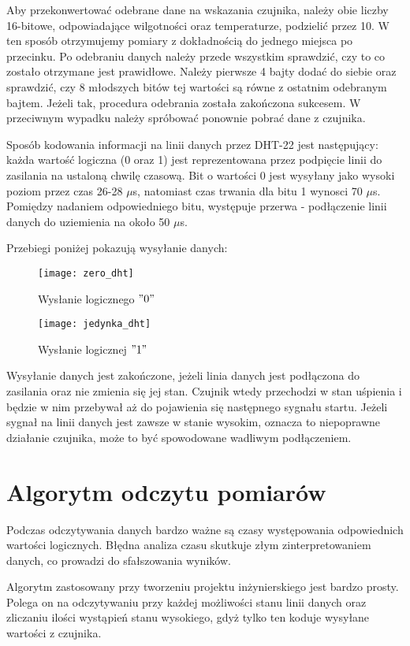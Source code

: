 Aby przekonwertować odebrane dane na wskazania czujnika, należy obie liczby 16-bitowe, odpowiadające wilgotności oraz temperaturze, podzielić przez 10. W ten sposób otrzymujemy pomiary z dokładnością do jednego miejsca po przecinku. Po odebraniu danych należy przede wszystkim sprawdzić, czy to co zostało otrzymane jest prawidłowe. Należy pierwsze 4 bajty dodać do siebie oraz sprawdzić, czy 8 młodszych bitów tej wartości są równe z ostatnim odebranym bajtem. Jeżeli tak, procedura odebrania została zakończona sukcesem. W przeciwnym wypadku należy spróbować ponownie pobrać dane z czujnika.

Sposób kodowania informacji na linii danych przez DHT-22 jest następujący: każda wartość logiczna (0 oraz 1) jest reprezentowana przez podpięcie linii do zasilania na ustaloną chwilę czasową. Bit o wartości 0 jest wysyłany jako wysoki poziom przez czas 26-28 $\mu$s, natomiast czas trwania dla bitu 1 wynosci 70 $\mu$s. Pomiędzy nadaniem odpowiedniego bitu, występuje przerwa - podłączenie linii danych do uziemienia na około 50 $\mu$s.

Przebiegi poniżej pokazują wysyłanie danych:
\begin{figure}[h]
\centering
\texttt{[image: zero\_dht]}
\caption{Wysłanie logicznego $"0"$}
\label{fig:zero_dht}
\end{figure}

\begin{figure}[h]
\centering
\texttt{[image: jedynka\_dht]}
\caption{Wysłanie logicznej $"1"$}
\label{fig:jedynka_dht}
\end{figure}

Wysyłanie danych jest zakończone, jeżeli linia danych jest podłączona do zasilania oraz nie zmienia się jej stan. Czujnik wtedy przechodzi w stan uśpienia i będzie w nim przebywał aż do pojawienia się następnego sygnału startu. Jeżeli sygnał na linii danych jest zawsze w stanie wysokim, oznacza to niepoprawne działanie czujnika, może to być spowodowane wadliwym podłączeniem. 

\section*{Algorytm odczytu pomiarów}
Podczas odczytywania danych bardzo ważne są czasy występowania odpowiednich wartości logicznych. Błędna analiza czasu skutkuje złym zinterpretowaniem danych, co prowadzi do sfałszowania wyników.

Algorytm zastosowany przy tworzeniu projektu inżynierskiego jest bardzo prosty. Polega on na odczytywaniu przy każdej możliwości stanu linii danych oraz zliczaniu ilości wystąpień stanu wysokiego, gdyż tylko ten koduje wysyłane wartości z czujnika.

